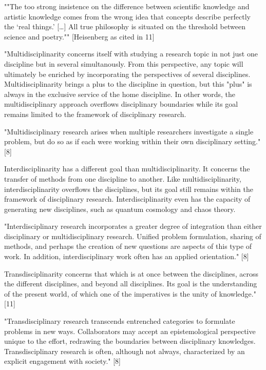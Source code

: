 ""The too strong insistence on the difference between scientific knowledge and artistic knowledge comes from the wrong idea that concepts describe perfectly the ‘real things.’ […] All true philosophy is situated on the threshold between science and poetry."" [Heisenberg as cited in 11]

"Multidisciplinarity concerns itself with studying a research topic in not just one discipline but in several simultanously. From this perspective, any topic will ultimately be enriched by incorporating the perspectives of several disciplines. Multidisciplinarity brings a plus to the discipline in question, but this "plus" is always in the exclusive service of the home discipline. In other words, the multidisciplinary approach overflows disciplinary boundaries while its goal remains limited to the framework of disciplinary research.

"Multidisciplinary research arises when multiple researchers investigate a single problem, but do so as if each were working within their own disciplinary setting." [8]

Interdisciplinarity has a different goal than multidisciplinarity. It concerns the transfer of methods from one discipline to another. Like multidisciplinarity, interdisciplinarity overflows the disciplines, but its goal still remains within the framework of disciplinary research. Interdisciplinarity even has the capacity of generating new disciplines, such as quantum cosmology and chaos theory.

"Interdisciplinary research incorporates a greater degree of integration than either disciplinary or multidisciplinary research. Unified problem formulation, sharing of methods, and perhaps the creation of new questions are aspects of this type of work. In addition, interdisciplinary work often has an applied orientation." [8]

Transdisciplinarity concerns that which is at once between the disciplines, across the different disciplines, and beyond all disciplines. Its goal is the understanding of the present world, of which one of the imperatives is the unity of knowledge." [11]

"Transdisciplinary research transcends entrenched categories to formulate problems in new ways. Collaborators may accept an epistemological perspective unique to the effort, redrawing the boundaries between disciplinary knowledges. Transdisciplinary research is often, although not always, characterized by an explicit engagement with society." [8]


